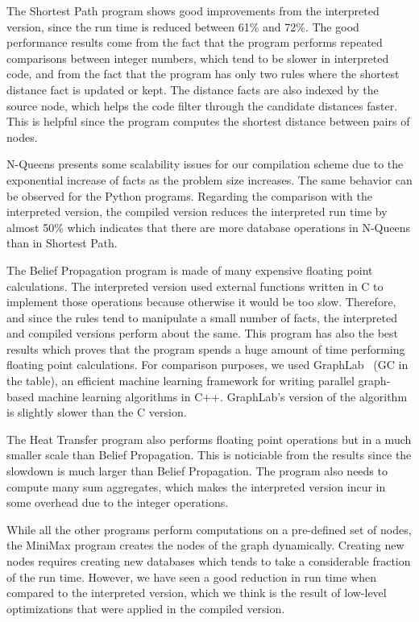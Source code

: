 The Shortest Path program shows good improvements from the interpreted version,
since the run time is reduced between 61\% and 72\%.  The good performance results
come from the fact that the program performs repeated comparisons between
integer numbers, which tend to be slower in interpreted code, and from the fact
that the program has only two rules where the shortest distance fact is updated
or kept.  The distance facts are also indexed by the source node, which helps
the code filter through the candidate distances faster. This is helpful
since the program computes the shortest distance between pairs of nodes.

N-Queens presents some scalability issues for our compilation scheme due to the
exponential increase of facts as the problem size increases.  The same behavior
can be observed for the Python programs. Regarding the comparison with the
interpreted version, the compiled version reduces the interpreted run time by
almost 50\% which indicates that there are more database operations in N-Queens
than in Shortest Path.

The Belief Propagation program is made of many expensive floating point
calculations. The interpreted version used external functions written in C to
implement those operations because otherwise it would be too slow. Therefore,
and since the rules tend to manipulate a small number of facts, the interpreted
and compiled versions perform about the same. This program has also the best
results which proves that the program spends a huge amount of time performing
floating point calculations. For comparison purposes, we used
GraphLab~\cite{GraphLab2010} (GC in the table), an efficient machine learning
framework for writing parallel graph-based machine learning algorithms in C++.
GraphLab's version of the algorithm is slightly slower than the C version.

The Heat Transfer program also performs floating point operations but in a much
smaller scale than Belief Propagation. This is noticiable from the results since
the slowdown is much larger than Belief Propagation. The program also needs to
compute many sum aggregates, which makes the interpreted version incur in some
overhead due to the integer operations.

While all the other programs perform computations on a pre-defined set of nodes,
the MiniMax program creates the nodes of the graph dynamically.  Creating new
nodes requires creating new databases which tends to take a considerable
fraction of the run time. However, we have seen a good reduction in run time
when compared to the interpreted version, which we think is the result of
low-level optimizations that were applied in the compiled version.

